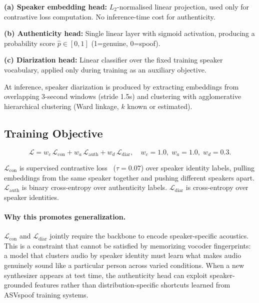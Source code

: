 \documentclass{article}
\begin{document}
\textbf{(a) Speaker embedding head:} $L_2$-normalised linear projection, used
only for contrastive loss computation. No inference-time cost for authenticity.

\textbf{(b) Authenticity head:} Single linear layer with sigmoid activation,
producing a probability score $\hat{p} \in [0,1]$ (1=genuine, 0=spoof).

\textbf{(c) Diarization head:} Linear classifier over the fixed training
speaker vocabulary, applied only during training as an auxiliary objective.

At inference, speaker diarization is produced by extracting embeddings from
overlapping 3-second windows (stride 1.5s) and clustering with agglomerative
hierarchical clustering (Ward linkage, $k$ known or estimated).

\subsection{Training Objective}

\begin{equation}
  \mathcal{L} = w_c\,\mathcal{L}_{\text{con}} +
                w_a\,\mathcal{L}_{\text{auth}} +
                w_d\,\mathcal{L}_{\text{diar}},
  \quad w_c=1.0,\; w_a=1.0,\; w_d=0.3.
  \label{eq:loss}
\end{equation}

$\mathcal{L}_{\text{con}}$ is supervised contrastive loss~\citep{khosla2020supcon}
($\tau=0.07$) over speaker identity labels, pulling embeddings from the same
speaker together and pushing different speakers apart. $\mathcal{L}_{\text{auth}}$
is binary cross-entropy over authenticity labels. $\mathcal{L}_{\text{diar}}$
is cross-entropy over speaker identities.

\paragraph{Why this promotes generalization.}
$\mathcal{L}_{\text{con}}$ and $\mathcal{L}_{\text{diar}}$ jointly require the
backbone to encode speaker-specific acoustics. This is a constraint that cannot
be satisfied by memorizing vocoder fingerprints: a model that clusters audio by
speaker identity must learn what makes audio genuinely sound like a particular
person across varied conditions. When a new synthesizer appears at test time, the
authenticity head can exploit speaker-grounded features rather than
distribution-specific shortcuts learned from ASVspoof training systems.
\end{document}
